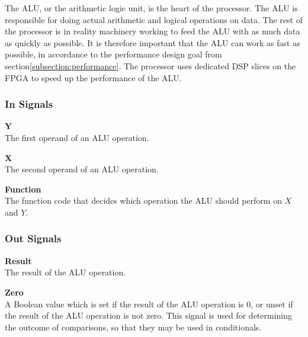 The ALU, or the arithmetic logic unit, is the heart of the processor.
The ALU is responsible for doing actual arithmetic and logical operations on data.
The rest of the processor is in reality machinery working to feed the ALU with as much data as quickly as possible.
It is therefore important that the ALU can work as fast as possible, in accordance to the performance design goal from section\vref{subsection:performance}.
The processor uses dedicated DSP slices on the FPGA to speed up the performance of the ALU.

\subsubsection{In Signals}

\begin{description}
\item{\textbf{Y}} \\
The first operand of an ALU operation.

\item{\textbf{X}} \\
The second operand of an ALU operation.

\item{\textbf{Function}} \\
The function code that decides which operation the ALU should perform on $ X $ and $ Y $.
\end{description}

\subsubsection{Out Signals}

\begin{description}
\item{\textbf{Result}} \\
    The result of the ALU operation.

\item{\textbf{Zero}} \\
    A Boolean value which is set if the result of the ALU operation is 0, or unset if the result of the ALU operation is not zero.
    This signal is used for determining the outcome of comparisons, so that they may be used in conditionals.
\end{description}
